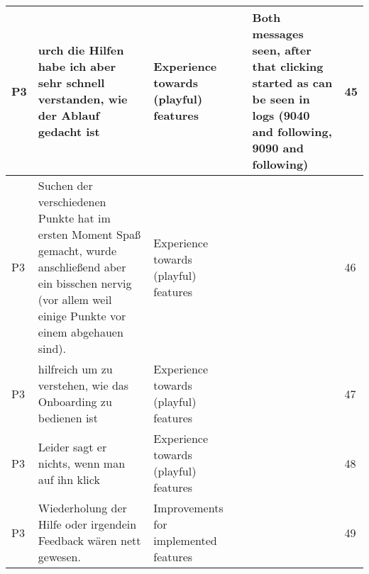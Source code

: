 \begin{appendices}
\begin{landscape}
\begin{longtable}{|p{0.8cm}|p{7cm}|p{3cm}|p{3cm}|p{5.5cm}|p{0.5cm}|}
      P3                   & urch die Hilfen habe ich aber sehr schnell verstanden, wie der Ablauf gedacht ist                                                                                                                                                                                           & Experience towards (playful) features    &                                    & Both messages seen, after that clicking started as can be seen in logs (9040 and following, 9090 and following)                                    & 45           \\ \hline
      P3                   & Suchen der verschiedenen Punkte hat im ersten Moment Spaß gemacht, wurde anschließend aber ein bisschen nervig (vor allem weil einige Punkte vor einem abgehauen sind).                                                                                                     & Experience towards (playful) features    &                                    &                                                                                                                                                    & 46           \\ \hline
      P3                   & hilfreich um zu verstehen, wie das Onboarding zu bedienen ist                                                                                                                                                                                                               & Experience towards (playful) features    &                                    &                                                                                                                                                    & 47           \\ \hline
      P3                   & Leider sagt er nichts, wenn man auf ihn klick                                                                                                                                                                                                                               & Experience towards (playful) features    &                                    &                                                                                                                                                    & 48           \\ \hline
      P3                   & Wiederholung der Hilfe oder irgendein Feedback wären nett gewesen.                                                                                                                                                                                                          & Improvements for implemented features    &                                    &                                                                                                                                                    & 49           \\ \hline

\end{longtable}
\end{landscape}
\end{appendices}

